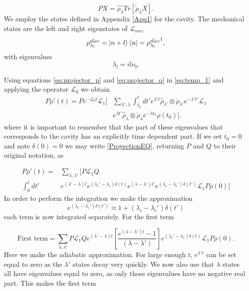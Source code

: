 \documentclass[reprint, amsmath,amssymb, aps,pra]{revtex4-1}
\begin{document}
\begin{equation}
PX = \hat{\rho_{\lambda}}Tr[\check{\rho}_{\lambda}X].
\end{equation} We employ the states defined in Appendix
\ref{App1} for the cavity. The mechanical states are the left and right
eigenstates of $\mathcal{L}_{mec}$
\begin{equation}
\hat{\rho_{\lambda_l}^{mec}}=\Ket{n+l}\Bra{n}=\check{\rho_{\lambda_l}^{mec}}^\dagger,
\end{equation} 
with eigenvalues
\begin{equation}
\lambda_l = i l \nu_0.
\end{equation}

Using equations \eqref{eq:projector_p} and \eqref{eq:projector_q} in
\eqref{eq:temp_1} and applying the operator $\mathcal{L}_0$ we obtain
\begin{align}\label{ProyectionEQ}
P\dot{\rho}'(t)=P e^{-\mathcal{L}_0 t}\mathcal{L}_1[&\sum_{\lambda',\lambda}\int_{t_0}^{t}dt'e^{\lambda' t} \hat{\rho}_{\lambda'} \otimes \check{\rho}_{\lambda'}e^{-\lambda' t'}\mathcal{L}_1\\
&e^{\lambda t'}\hat{\rho}_{\lambda} \otimes \check{\rho}_{\lambda} e^{-\lambda t_0}\rho(t_0)]\nonumber.
\end{align} where it is important to remember that the part of these eigenvalues that corresponds to the cavity has an explicitly time dependent part. If we  set $t_0=0$ and note $\delta(0)=0$ we may write \eqref{ProyectionEQ}, returning $P$ and $Q$ to their original notation, as

\begin{align}
P\dot{\rho}'(t)=&\sum_{\lambda,\lambda'}[P \mathcal{L}_1Q\\
\int_0^t dt' & e^{(\lambda'-\lambda)t}e^{(\lambda_c'-\lambda_c)\delta(t)}e^{(\lambda-\lambda')t'}e^{(\lambda_c-\lambda_c')\delta(t')}\mathcal{L}_1P\rho(0)]\nonumber
\end{align} In order to perform the integration we make the approximation
\begin{equation}
e^{(\lambda_c-\lambda_c')\delta(t')} \approx 1+(\lambda_c-\lambda_c')\delta(t')
\end{equation} each term is now integrated separately. For the
first term

\begin{equation}
\text{First term}=\sum_{\lambda,\lambda'}P \mathcal{L}_1Qe^{(\lambda'-\lambda)t}[\frac{e^{(\lambda-\lambda')t}-1}{(\lambda-\lambda')}]e^{(\lambda_c'-\lambda_c)\delta(t)}\mathcal{L}_1P\rho(0).
\end{equation} Here we make the adiabatic approximation. For large enough $t$, $e^{\lambda't}$ can be set equal to zero as the $\lambda'$ states decay very quickly. We now also use that $\lambda$ states all have eigenvalues equal to zero, as only those eigenvalues have no negative real part. This makes the first term
\end{document}
